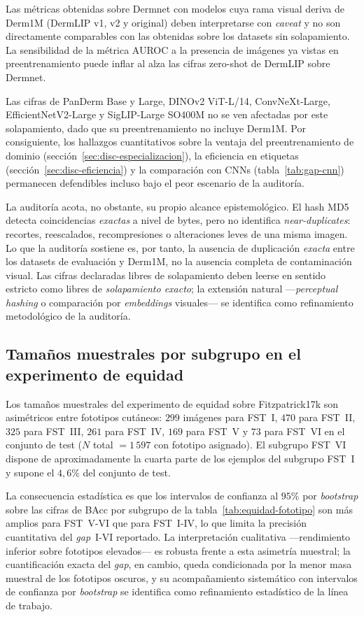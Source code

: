 Las métricas obtenidas sobre Dermnet con modelos cuya rama visual
deriva de Derm1M (DermLIP v1, v2 y original) deben interpretarse con
\emph{caveat} y no son directamente comparables con las obtenidas
sobre los datasets sin solapamiento. La sensibilidad de la métrica
AUROC a la presencia de imágenes ya vistas en preentrenamiento puede
inflar al alza las cifras zero-shot de DermLIP sobre Dermnet.

Las cifras de PanDerm Base y Large, DINOv2 ViT-L/14,
ConvNeXt-Large, EfficientNetV2-Large y SigLIP-Large SO400M no se
ven afectadas por este solapamiento, dado que su preentrenamiento
no incluye Derm1M. Por consiguiente, los hallazgos cuantitativos
sobre la ventaja del preentrenamiento de dominio
(sección~\ref{sec:disc-especializacion}), la eficiencia en etiquetas
(sección~\ref{sec:disc-eficiencia}) y la comparación con CNNs
(tabla~\ref{tab:gap-cnn}) permanecen defendibles incluso bajo el
peor escenario de la auditoría.

La auditoría acota, no obstante, su propio alcance epistemológico. El
hash MD5 detecta coincidencias \emph{exactas} a nivel de bytes, pero
no identifica \emph{near-duplicates}: recortes, reescalados,
recompresiones o alteraciones leves de una misma imagen. Lo que la
auditoría sostiene es, por tanto, la ausencia de duplicación
\emph{exacta} entre los datasets de evaluación y Derm1M, no la
ausencia completa de contaminación visual. Las cifras declaradas
libres de solapamiento deben leerse en sentido estricto como libres de
\emph{solapamiento exacto}; la extensión natural ---\emph{perceptual
hashing} o comparación por \emph{embeddings} visuales--- se identifica
como refinamiento metodológico de la auditoría.

\subsection{Tamaños muestrales por subgrupo en el experimento de equidad}
\label{sec:lim-muestrales}

Los tamaños muestrales del experimento de equidad sobre
Fitzpatrick17k son asimétricos entre fototipos cutáneos: $299$
imágenes para FST~I, $470$ para FST~II, $325$ para FST~III,
$261$ para FST~IV, $169$ para FST~V y $73$ para FST~VI
en el conjunto de test ($N$ total $=1\,597$ con fototipo
asignado). El subgrupo FST~VI dispone de aproximadamente la cuarta
parte de los ejemplos del subgrupo FST~I y supone el $4{,}6\%$
del conjunto de test.

La consecuencia estadística es que los intervalos de confianza al
$95\%$ por \emph{bootstrap} sobre las cifras de
BAcc por subgrupo de la tabla~\ref{tab:equidad-fototipo} son más
amplios para FST~V-VI que para FST~I-IV, lo que limita la
precisión cuantitativa del \emph{gap}~I-VI reportado. La
interpretación cualitativa ---rendimiento inferior sobre fototipos
elevados--- es robusta frente a esta asimetría muestral; la
cuantificación exacta del \emph{gap}, en cambio, queda condicionada
por la menor masa muestral de los fototipos oscuros, y su
acompañamiento sistemático con intervalos de confianza por
\emph{bootstrap} se identifica como refinamiento estadístico de la
línea de trabajo.

